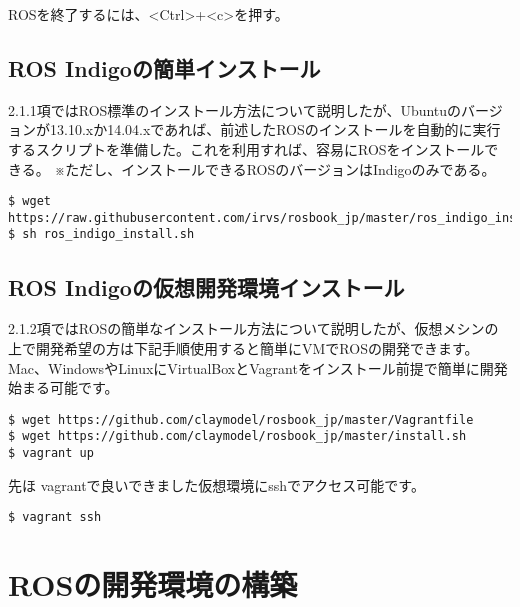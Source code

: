 ROSを終了するには、<Ctrl>+<c>を押す。

\subsection{ROS Indigoの簡単インストール}

2.1.1項ではROS標準のインストール方法について説明したが、Ubuntuのバージョンが13.10.xか14.04.xであれば、前述したROSのインストールを自動的に実行するスクリプトを準備した。これを利用すれば、容易にROSをインストールできる。
※ただし、インストールできるROSのバージョンはIndigoのみである。

\begin{lstlisting}[language=ROS]
$ wget https://raw.githubusercontent.com/irvs/rosbook_jp/master/ros_indigo_install.sh
$ sh ros_indigo_install.sh
\end{lstlisting}

\subsection{ROS Indigoの仮想開発環境インストール}

2.1.2項ではROSの簡単なインストール方法について説明したが、仮想メシンの上で開発希望の方は下記手順使用すると簡単にVMでROSの開発できます。Mac、WindowsやLinuxにVirtualBoxとVagrantをインストール前提で簡単に開発始まる可能です。

\begin{lstlisting}[language=ROS]
$ wget https://github.com/claymodel/rosbook_jp/master/Vagrantfile
$ wget https://github.com/claymodel/rosbook_jp/master/install.sh
$ vagrant up
\end{lstlisting}

先ほ vagrantで良いできました仮想環境にsshでアクセス可能です。

\begin{lstlisting}[language=ROS]
$ vagrant ssh
\end{lstlisting}

\section{ROSの開発環境の構築}

